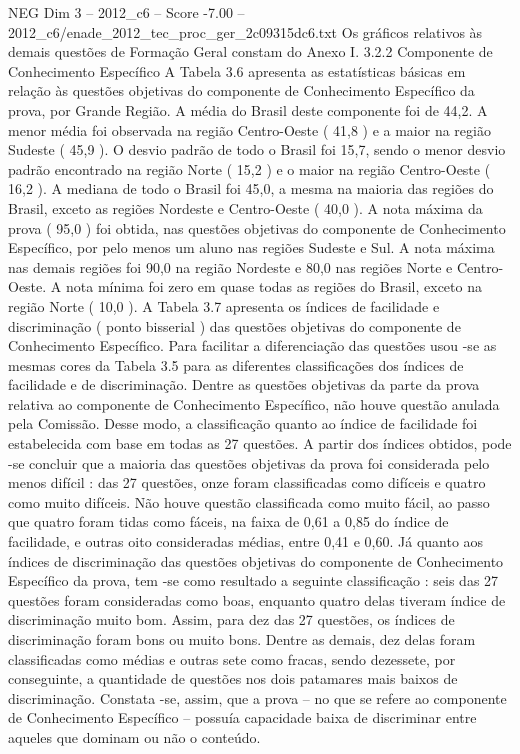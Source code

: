 \begin{textsample}{NEG Dim 3 – 2012\_c6 – Score -7.00 – 2012\_c6/enade\_2012\_tec\_proc\_ger\_2c09315dc6.txt}
Os gráficos relativos às demais questões de Formação Geral constam do Anexo I. 3.2.2 Componente de Conhecimento Específico A Tabela 3.6 apresenta as estatísticas básicas em relação às questões objetivas do componente de Conhecimento Específico da prova, por Grande Região.
A média do Brasil deste componente foi de 44,2.
A menor média foi observada na região Centro-Oeste ( 41,8 ) e a maior na região Sudeste ( 45,9 ).
O desvio padrão de todo o Brasil foi 15,7, sendo o menor desvio padrão encontrado na região Norte ( 15,2 ) e o maior na região Centro-Oeste ( 16,2 ).
A mediana de todo o Brasil foi 45,0, a mesma na maioria das regiões do Brasil, exceto as regiões Nordeste e Centro-Oeste ( 40,0 ).
A nota máxima da prova ( 95,0 ) foi obtida, nas questões objetivas do componente de Conhecimento Específico, por pelo menos um aluno nas regiões Sudeste e Sul.
A nota máxima nas demais regiões foi 90,0 na região Nordeste e 80,0 nas regiões Norte e Centro-Oeste.
A nota mínima foi zero em quase todas as regiões do Brasil, exceto na região Norte ( 10,0 ).
A Tabela 3.7 apresenta os índices de facilidade e discriminação ( ponto bisserial ) das questões objetivas do componente de Conhecimento Específico.
Para facilitar a diferenciação das questões usou -se as mesmas cores da Tabela 3.5 para as diferentes classificações dos índices de facilidade e de discriminação.
Dentre as questões objetivas da parte da prova relativa ao componente de Conhecimento Específico, não houve questão anulada pela Comissão.
Desse modo, a classificação quanto ao índice de facilidade foi estabelecida com base em todas as 27 questões.
A partir dos índices obtidos, pode -se concluir que a maioria das questões objetivas da prova foi considerada pelo menos difícil : das 27 questões, onze foram classificadas como difíceis e quatro como muito difíceis.
Não houve questão classificada como muito fácil, ao passo que quatro foram tidas como fáceis, na faixa de 0,61 a 0,85 do índice de facilidade, e outras oito consideradas médias, entre 0,41 e 0,60.
Já quanto aos índices de discriminação das questões objetivas do componente de Conhecimento Específico da prova, tem -se como resultado a seguinte classificação : seis das 27 questões foram consideradas como boas, enquanto quatro delas tiveram índice de discriminação muito bom.
Assim, para dez das 27 questões, os índices de discriminação foram bons ou muito bons.
Dentre as demais, dez delas foram classificadas como médias e outras sete como fracas, sendo dezessete, por conseguinte, a quantidade de questões nos dois patamares mais baixos de discriminação.
Constata -se, assim, que a prova – no que se refere ao componente de Conhecimento Específico – possuía capacidade baixa de discriminar entre aqueles que dominam ou não o conteúdo.

\end{textsample}
